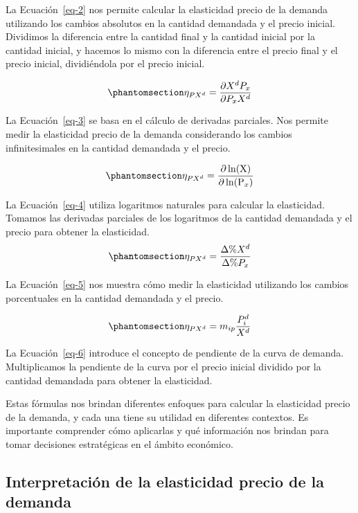 \documentclass[
  a4paper,
]{article}
\begin{document}
La Ecuación~\ref{eq-2} nos permite calcular la elasticidad precio de la
demanda utilizando los cambios absolutos en la cantidad demandada y el
precio inicial. Dividimos la diferencia entre la cantidad final y la
cantidad inicial por la cantidad inicial, y hacemos lo mismo con la
diferencia entre el precio final y el precio inicial, dividiéndola por
el precio inicial.

\begin{equation}\phantomsection\label{eq-3}{
\eta _{PX^d} = \frac{\partial X^d P_x}{\partial P_x X^d}
}\end{equation}

La Ecuación~\ref{eq-3} se basa en el cálculo de derivadas parciales. Nos
permite medir la elasticidad precio de la demanda considerando los
cambios infinitesimales en la cantidad demandada y el precio.

\begin{equation}\phantomsection\label{eq-4}{
\eta _{PX^d} = \frac{\partial \ln(\mathrm X)}{\partial  \ln(\mathrm P_x)}
}\end{equation}

La Ecuación~\ref{eq-4} utiliza logaritmos naturales para calcular la
elasticidad. Tomamos las derivadas parciales de los logaritmos de la
cantidad demandada y el precio para obtener la elasticidad.
\begin{equation}\phantomsection\label{eq-5}{
\eta _{PX^d} = \frac{\Delta \% X^d}{\Delta \% P_x}
}\end{equation}

La Ecuación~\ref{eq-5} nos muestra cómo medir la elasticidad utilizando
los cambios porcentuales en la cantidad demandada y el precio.

\begin{equation}\phantomsection\label{eq-6}{
\eta_{PX^d} = m_{ip} \frac{P_i^d}{X^d}
}\end{equation}

La Ecuación~\ref{eq-6} introduce el concepto de pendiente de la curva de
demanda. Multiplicamos la pendiente de la curva por el precio inicial
dividido por la cantidad demandada para obtener la elasticidad.

Estas fórmulas nos brindan diferentes enfoques para calcular la
elasticidad precio de la demanda, y cada una tiene su utilidad en
diferentes contextos. Es importante comprender cómo aplicarlas y qué
información nos brindan para tomar decisiones estratégicas en el ámbito
económico.

\subsection{Interpretación de la elasticidad precio de la
demanda}\label{interpretaciuxf3n-de-la-elasticidad-precio-de-la-demanda}
\end{document}
